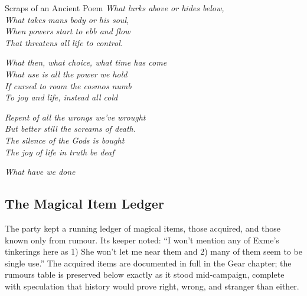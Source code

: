 \begin{DndComment}{Scraps of an Ancient Poem}
\textit{What lurks above or hides below,\\
What takes mans body or his soul,\\
When powers start to ebb and flow\\
That threatens all life to control.}

\textit{What then, what choice, what time has come\\
What use is all the power we hold\\
If cursed to roam the cosmos numb\\
To joy and life, instead all cold}

\textit{Repent of all the wrongs we've wrought\\
But better still the screams of death.\\
The silence of the Gods is bought\\
The joy of life in truth be deaf}

\textit{What have we done}
\end{DndComment}

\subsection*{The Magical Item Ledger}

The party kept a running ledger of magical items, those acquired, and those known only from rumour. Its keeper noted: ``I won't mention any of Exme's tinkerings here as 1) She won't let me near them and 2) many of them seem to be single use.'' The acquired items are documented in full in the Gear chapter; the rumours table is preserved below exactly as it stood mid-campaign, complete with speculation that history would prove right, wrong, and stranger than either.

